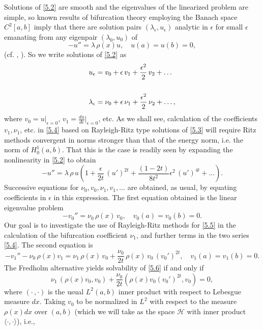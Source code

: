 \documentclass[final]{siamltex}
\numberwithin{equation}{section}
\begin{document}
Solutions of \eqref{5.2} are smooth and the eigenvalues of the linearized problem are simple, so known results of bifurcation theory employing the Banach space $C^2[a,b]$ imply that there are solution pairs $(\lambda_{\epsilon}, u_{\epsilon})$ analytic in $\epsilon$ for small $\epsilon$
emanating from any eigenpair $(\lambda_0, u_0)$ of
\begin{equation} \label{5.3}
-u'' = \lambda \, \rho(x) u, \quad
u(a)=u(b)=0,
\end{equation}
(cf. \cite{Sattinger}, \cite{Vainberg-Trenogin}). So we write solutions of \eqref{5.2} as
\begin{align} \label{5.4}
u_{\epsilon}&= v_0+ \epsilon \, v_1 + \frac{\epsilon^2}{2} \, v_2+\ldots \notag \\
& \\
\lambda_{\epsilon}&= \nu_0+ \epsilon \, \nu_1 + \frac{\epsilon^2}{2} \, \nu_2+\ldots, \notag
\end{align}
where $v_0=u|_{\epsilon=0}$, $v_1=\frac{d u}{d \epsilon}|_{\epsilon=0}$, etc. As we shall see, calculation of the coefficients $v_1, \nu_1$, etc. in \eqref{5.4} based on Rayleigh-Ritz type solutions of \eqref{5.3} will require Ritz methods convergent in norms stronger than that of the energy norm, i.e. the norm of $H_0^1(a,b)$. That this is the case is readily seen by expanding the nonlinearity in \eqref{5.2} to obtain
\[-u''= \lambda \, \rho \, u \left(1+ \frac{\epsilon}{2 t} \, \left(u'\right)^{2 t} + \frac{(1-2t)}{8 t^2} \epsilon^2 \, \left(u'\right)^{4 t}+\ldots \right).\]
Successive equations for $\nu_0, v_0, \nu_1, v_1, \ldots$ are obtained, as usual, by equating coefficients in $\epsilon$ in this expression.
The first equation obtained is the linear eigenvalue problem
\begin{equation} \label{5.5}
-v_0''=\nu_0 \, \rho(x) \, v_0, \quad v_0(a)=v_0(b)=0.
\end{equation}
Our goal is to investigate the use of Rayleigh-Ritz methods for \eqref{5.5} in the calculation of the bifurcation coefficient $\nu_1$, and further terms in the two series
\eqref{5.4}. The second equation is
\begin{equation} \label{5.6}
-v_1''-\nu_0\, \rho(x) v_1=\nu_1 \, \rho(x) \, v_0 +\frac{\nu_0}{2 t} \, \rho(x) \, v_0 \, \left(v_0'\right)^{2 t}, \quad v_1(a)=v_1(b)=0.
\end{equation}
The Fredholm alternative yields solvability of \eqref{5.6} if and only if
\[\nu_1 \, \left(\rho(x) v_0, v_0\right) + \frac{\nu_0}{2 t} \left(\rho(x) v_0 (v_0')^{2t}, v_0\right)=0,\]
where $\left(\cdot\, , \cdot\right)$ is the usual $L^2(a,b)$ inner product with respect to Lebesgue measure $dx$. Taking $v_0$ to be normalized in $L^2$ with respect to the measure $\rho(x) dx$ over $(a,b)$ (which we will take as the space $\mathcal{H}$ with inner product $\langle \cdot, \cdot \rangle$), i.e.,
\end{document}

